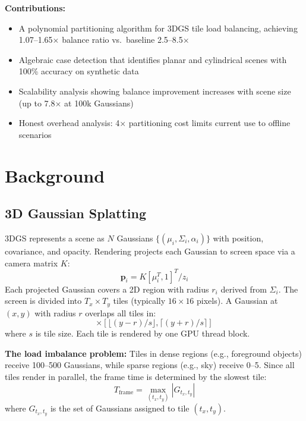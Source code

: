 \documentclass[10pt,twocolumn]{article}
\begin{document}
\textbf{Contributions:}
\begin{itemize}
    \item A polynomial partitioning algorithm for 3DGS tile load balancing, achieving 1.07--1.65$\times$ balance ratio vs.\ baseline 2.5--8.5$\times$
    \item Algebraic case detection that identifies planar and cylindrical scenes with 100\% accuracy on synthetic data
    \item Scalability analysis showing balance improvement increases with scene size (up to 7.8$\times$ at 100k Gaussians)
    \item Honest overhead analysis: 4$\times$ partitioning cost limits current use to offline scenarios
\end{itemize}

\section{Background}

\subsection{3D Gaussian Splatting}

3DGS represents a scene as $N$ Gaussians $\{(\mu_i, \Sigma_i, \alpha_i)\}$ with position, covariance, and opacity. Rendering projects each Gaussian to screen space via a camera matrix $K$:
\begin{equation}
    \mathbf{p}_i = K [\mu_i^T, 1]^T / z_i
\end{equation}
Each projected Gaussian covers a 2D region with radius $r_i$ derived from $\Sigma_i$. The screen is divided into $T_x \times T_y$ tiles (typically $16 \times 16$ pixels). A Gaussian at $(x, y)$ with radius $r$ overlaps all tiles in:
\begin{equation}
    [\lfloor(x-r)/s\rfloor, \lceil(x+r)/s\rceil] \times [\lfloor(y-r)/s\rfloor, \lceil(y+r)/s\rceil]
\end{equation}
where $s$ is tile size. Each tile is rendered by one GPU thread block.

\textbf{The load imbalance problem:} Tiles in dense regions (e.g., foreground objects) receive 100--500 Gaussians, while sparse regions (e.g., sky) receive 0--5. Since all tiles render in parallel, the frame time is determined by the slowest tile:
\begin{equation}
    T_{\text{frame}} = \max_{(t_x, t_y)} |G_{t_x, t_y}|
\end{equation}
where $G_{t_x, t_y}$ is the set of Gaussians assigned to tile $(t_x, t_y)$.
\end{document}
